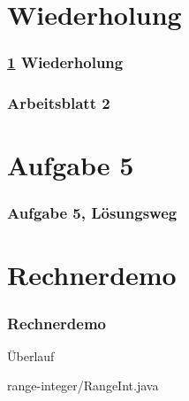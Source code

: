 \documentclass[9pt,german]{beamer}%
\begin{document}
\maketitle%
\addtocounter{framenumber}{-1}%


\section{Wiederholung}\label{K:wdh}
\begin{frame}
  \frametitle{\ref{K:wdh} Wiederholung}%
\tableofcontents[current]
\end{frame}


\begin{frame}
  \frametitle{Arbeitsblatt 2}%
\tableofcontents
\end{frame}
\setcounter{exercise}{4}

\section{Aufgabe 5}



\begin{frame}[t]%
  \frametitle{Aufgabe 5, L\"osungsweg}%
\medskip


\end{frame}

\setcounter{exercise}{6}


\def\stitle{Rechnerdemo}
\section{\stitle}
\begin{frame}[fragile]%
  \frametitle{\stitle}%
\medskip

\"Uberlauf

{range-integer/RangeInt.java}
\end{frame}
\end{document}
